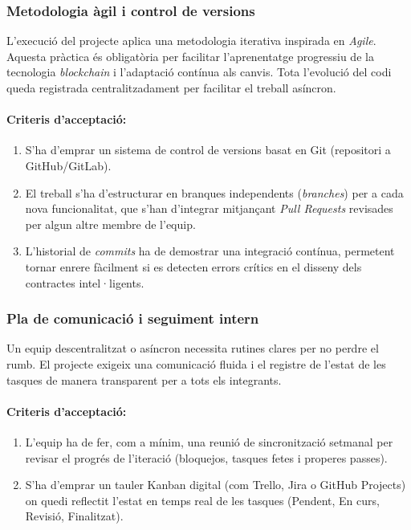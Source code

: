 \subsubsection{Metodologia àgil i control de versions}

L'execució del projecte aplica una metodologia iterativa inspirada en \textit{Agile}. 
Aquesta pràctica és obligatòria per facilitar l'aprenentatge progressiu de la tecnologia \textit{blockchain} i l'adaptació contínua als canvis. 
Tota l'evolució del codi queda registrada centralitzadament per facilitar el treball asíncron.

\paragraph{Criteris d'acceptació:}
\begin{enumerate}[label=\roman*.]
    \item S'ha d'emprar un sistema de control de versions basat en Git (repositori a GitHub/GitLab).
    \item El treball s'ha d'estructurar en branques independents (\textit{branches}) per a cada nova funcionalitat, que s'han d'integrar mitjançant \textit{Pull Requests} revisades per algun altre membre de l'equip.
    \item L'historial de \textit{commits} ha de demostrar una integració contínua, permetent tornar enrere fàcilment si es detecten errors crítics en el disseny dels contractes intel·ligents.
\end{enumerate}

\subsubsection{Pla de comunicació i seguiment intern}
Un equip descentralitzat o asíncron necessita rutines clares per no perdre el rumb. 
El projecte exigeix una comunicació fluida i el registre de l'estat de les tasques de manera transparent per a tots els integrants.

\paragraph{Criteris d'acceptació:}
\begin{enumerate}[label=\roman*.]
    \item L'equip ha de fer, com a mínim, una reunió de sincronització setmanal per revisar el progrés de l'iteració (bloquejos, tasques fetes i properes passes).
    \item S'ha d'emprar un tauler Kanban digital (com Trello, Jira o GitHub Projects) on quedi reflectit l'estat en temps real de les tasques (Pendent, En curs, Revisió, Finalitzat).
\end{enumerate}

